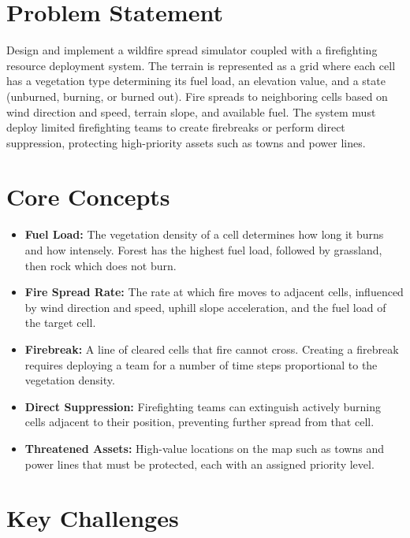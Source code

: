 \section{Problem Statement}

Design and implement a wildfire spread simulator coupled with a firefighting resource deployment system. The terrain is represented as a grid where each cell has a vegetation type determining its fuel load, an elevation value, and a state (unburned, burning, or burned out). Fire spreads to neighboring cells based on wind direction and speed, terrain slope, and available fuel. The system must deploy limited firefighting teams to create firebreaks or perform direct suppression, protecting high-priority assets such as towns and power lines.

\section{Core Concepts}

\begin{itemize}
  \item \textbf{Fuel Load:} The vegetation density of a cell determines how long it burns and how intensely. Forest has the highest fuel load, followed by grassland, then rock which does not burn.
  \item \textbf{Fire Spread Rate:} The rate at which fire moves to adjacent cells, influenced by wind direction and speed, uphill slope acceleration, and the fuel load of the target cell.
  \item \textbf{Firebreak:} A line of cleared cells that fire cannot cross. Creating a firebreak requires deploying a team for a number of time steps proportional to the vegetation density.
  \item \textbf{Direct Suppression:} Firefighting teams can extinguish actively burning cells adjacent to their position, preventing further spread from that cell.
  \item \textbf{Threatened Assets:} High-value locations on the map such as towns and power lines that must be protected, each with an assigned priority level.
\end{itemize}

\section{Key Challenges}

